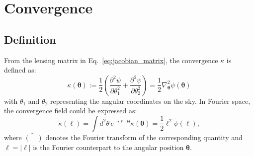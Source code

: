 \section{Convergence} \label{sec:convergence}
\subsection{Definition}
From the lensing matrix in Eq.~\eqref{eq:jacobian_matrix}, the convergence $\kappa$ is defined as:
\begin{equation}
    \label{eq:convergence}
        \kappa(\boldsymbol{\theta}) := \frac{1}{2} \left( \frac{\partial^2 \psi}{\partial \theta_1^2} + \frac{\partial^2 \psi}{\partial \theta_2^2} \right) = \frac{1}{2} \nabla_{\boldsymbol{\theta}}^2 \psi(\boldsymbol{\theta})
\end{equation}
with $\theta_1$ and $\theta_2$ representing the angular coordinates on the sky.
In Fourier space, the convergence field could be expressed as:
\begin{equation}
    \label{eq:fourier_convergence}
    \tilde{\kappa}(\boldsymbol{\ell}) = \int d^2\theta \, e^{-i\boldsymbol{\ell} \cdot \boldsymbol{\theta}} \kappa(\boldsymbol{\theta}) = \frac{1}{2} \ell^2 \tilde{\psi}(\boldsymbol{\ell}),
\end{equation}
where $\tilde{(\quad)}$ denotes the Fourier transform of the corresponding quantity and $\ell = |\boldsymbol{\ell}|$ is the Fourier counterpart to the angular position $\boldsymbol{\theta}$.

